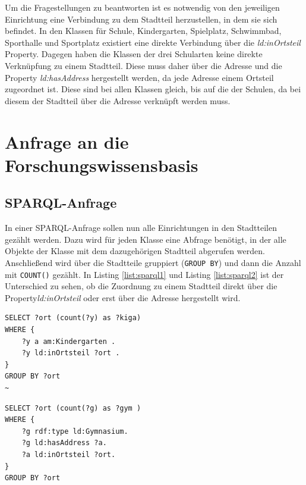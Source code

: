 \documentclass[parskip]{scrartcl}
\begin{document}
Um die Fragestellungen zu beantworten ist es notwendig von den jeweiligen Einrichtung eine Verbindung zu dem Stadtteil herzustellen, in dem sie sich befindet. In den Klassen für Schule, Kindergarten, Spielplatz, Schwimmbad, Sporthalle und Sportplatz existiert eine direkte Verbindung über die \textit{ld:inOrtsteil} Property. Dagegen haben die Klassen der drei Schularten keine direkte Verknüpfung zu einem Stadtteil. Diese muss daher über die Adresse und die Property \textit{ld:hasAddress} hergestellt werden, da jede Adresse einem Ortsteil zugeordnet ist. Diese sind bei allen Klassen gleich, bis auf die der Schulen, da bei diesem der Stadtteil über die Adresse verknüpft werden muss. 



\section{Anfrage an die Forschungswissensbasis}

\subsection{SPARQL-Anfrage}
In einer SPARQL-Anfrage sollen nun alle Einrichtungen in den Stadtteilen gezählt werden. Dazu wird für jeden Klasse eine Abfrage benötigt, in der alle Objekte der Klasse mit dem dazugehörigen Stadtteil abgerufen werden. Anschließend wird über die Stadtteile gruppiert (\texttt{GROUP BY}) und dann die Anzahl mit  \texttt{COUNT()} gezählt. In Listing \ref{list:sparql1} und Listing \ref{list:sparql2} ist der Unterschied zu sehen, ob die Zuordnung zu einem Stadtteil direkt über die Property\textit{ld:inOrtsteil} oder erst über die Adresse hergestellt wird.


\lstset{
language=c,
frame=single,
xrightmargin=.5em,
xleftmargin=.5em
}


\begin{minipage}{.5\textwidth}
\begin{lstlisting}[caption={Abfrage direkt über ld:inOrtsteil}, label={list:sparql1}]
SELECT ?ort (count(?y) as ?kiga)
WHERE {
    ?y a am:Kindergarten .
    ?y ld:inOrtsteil ?ort . 
}
GROUP BY ?ort
~
\end{lstlisting}
\end{minipage}%
\begin{minipage}{.5\textwidth}
\begin{lstlisting}[caption={Abfrage über ld:hasAddress}, label={list:sparql2}]
SELECT ?ort (count(?g) as ?gym )
WHERE {
    ?g rdf:type ld:Gymnasium.
    ?g ld:hasAddress ?a.
    ?a ld:inOrtsteil ?ort.
}
GROUP BY ?ort
\end{lstlisting}
\end{minipage}
\end{document}
